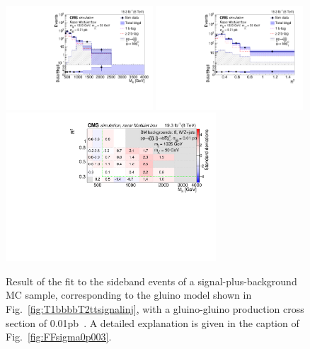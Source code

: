 \begin{figure}[htb!]
\centering
\includegraphics[width=0.49\textwidth]{figs/analysis8TeV/MR_T1bbbb_0p01_MultiJet.pdf}
\includegraphics[width=0.49\textwidth]{figs/analysis8TeV/RSQ_T1bbbb_0p01_MultiJet.pdf}
\includegraphics[width=0.7\textwidth]{figs/analysis8TeV/nSigmaLog_0p01_MultiJet.pdf}
\caption{Result of the fit to the sideband events of a
  signal-plus-background MC sample, corresponding to the gluino model
  shown in Fig.~\ref{fig:T1bbbbT2ttsignalinj}, with a gluino-gluino production cross section of 0.01\unit{pb}~\cite{jmgd}. A detailed explanation is
  given in the caption of Fig.~\ref{fig:FFsigma0p003}.\label{fig:FFsigma0p01}}
\end{figure}

